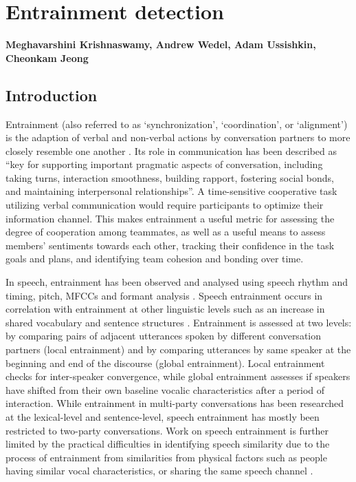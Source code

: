 \chapter{Entrainment detection}
\label{ch:entrainment}

\textbf{Meghavarshini Krishnaswamy, Andrew Wedel, Adam Ussishkin, Cheonkam Jeong} 
\section{Introduction}

    Entrainment (also referred to as `synchronization', `coordination', or `alignment') is the adaption of verbal and non-verbal actions by conversation partners to more closely resemble one another \parencite{borrie2014}. Its role in communication has been described as ``key for supporting important pragmatic aspects of conversation, including taking turns, interaction smoothness, building rapport, fostering social bonds, and maintaining interpersonal relationships''\parencite{borrie2019}. A time-sensitive cooperative task utilizing verbal communication would require participants to optimize their information channel. This makes entrainment a useful metric for assessing the degree of cooperation among teammates, as well as a useful means to assess members' sentiments towards each other, tracking their confidence in the task goals and plans, and identifying team cohesion and bonding over time.

    In speech, entrainment has been observed and analysed using speech rhythm and
    timing, pitch, MFCCs and formant analysis \parencite{reichel2018prosodic,borrie2019syncing}. Speech entrainment occurs in correlation with entrainment at other linguistic levels such as an increase in shared vocabulary and sentence structures \parencite{rahimi2017entrainment}. Entrainment is assessed at two levels: by comparing pairs of adjacent utterances spoken by different conversation partners (local entrainment) and by comparing utterances by same speaker at the beginning and end of the discourse (global entrainment). Local entrainment checks for inter-speaker convergence, while global entrainment assesses if speakers have shifted from their own baseline vocalic characteristics after a period of interaction. While entrainment in multi-party conversations has been researched at the lexical-level and sentence-level, speech entrainment has mostly been restricted to two-party conversations. Work on speech entrainment is further limited by the practical difficulties in identifying speech similarity due to the process of entrainment from similarities from physical factors such as people having similar vocal characteristics, or sharing the same speech channel \parencite{nasir2020}.
    
